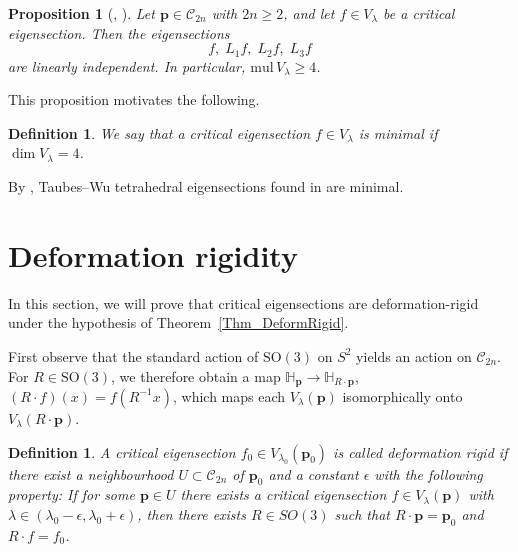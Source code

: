 \documentclass[11pt]{amsart}
\newtheorem{definition}[theorem]{Definition}
\newtheorem{proposition}[theorem]{Proposition}
\newcommand{\MC}{\mathcal{C}}
\newcommand{\ep}{\epsilon}
\newcommand{\SO}{\mathrm{SO}}
\newcommand{\mbH}{\mathbb{H}}
\newcommand{\mbp}{\mathbf{p}}
\begin{document}
\begin{proposition}[{\cite[Proposition~4.5, Theorem~1.5]{chen2024existence}, \cite{taubes2021topological}}]
	Let $\mbp\in\MC_{2n}$ with $2n\ge 2$, and let $f\in V_{\lambda}$ be a critical eigensection.  
	Then the eigensections
	\[
	f,\; L_1 f,\; L_2 f,\; L_3 f
	\]
	are linearly independent.  
	In particular, $\mathrm{mul}\,V_{\lambda}\ge 4$.
\end{proposition}

This proposition motivates the following. 

\begin{definition}
	We say that a critical eigensection $f\in V_{\lambda}$ is \emph{minimal} if $\dim V_{\lambda}=4$.
\end{definition}
By \cite[Section 5.3]{chen2024existence}, Taubes--Wu tetrahedral eigensections found in \cite{taubes2020examples} are minimal.

\section{Deformation rigidity}
In this section, we will prove that critical eigensections are deformation-rigid under the hypothesis of Theorem~\ref{Thm_DeformRigid}. 

First observe that the standard action of $\SO(3)$ on $S^2$ yields an action on $\MC_{2n}$. For $R\in\SO(3)$, we therefore obtain a map $\mbH_{\mbp}\to \mbH_{R\cdot\mbp}$,\  $(R\cdot f)(x) = f(R^{-1}x)$, which maps each $V_\lambda(\mbp)$ isomorphically onto $V_\lambda (R\cdot \mbp)$.  

\begin{definition}
	A critical eigensection $f_0\in V_{\lambda_0}(\mbp_0)$ is called \emph{deformation rigid} if there exist a neighbourhood $U\subset \MC_{2n}$ of $\mbp_0$ and a constant $\epsilon$ with the following property: If for some $\mbp\in U$ there exists a critical eigensection $f\in V_{\lambda}(\mbp)$ with $\lambda\in (\lambda_0-\epsilon, \lambda_0+\epsilon)$, then there exists $R\in SO(3)$ such that $R\cdot \mbp=\mbp_0$ and $R\cdot f=f_0$.
\end{definition}

\end{document}
